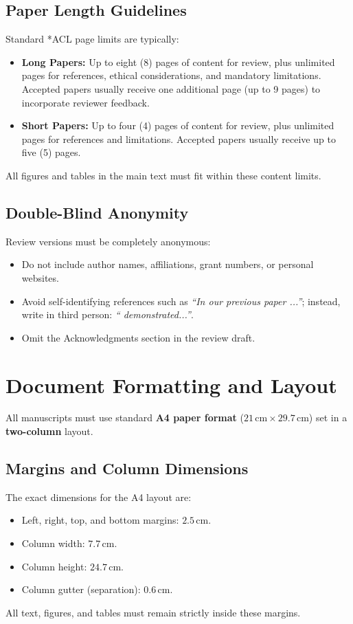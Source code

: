 \documentclass[11pt]{article}
\begin{document}
\subsection{Paper Length Guidelines}
Standard *ACL page limits are typically:
\begin{itemize}
    \item \textbf{Long Papers:} Up to eight (8) pages of content for review, plus unlimited pages for references, ethical considerations, and mandatory limitations. Accepted papers usually receive one additional page (up to 9 pages) to incorporate reviewer feedback.
    \item \textbf{Short Papers:} Up to four (4) pages of content for review, plus unlimited pages for references and limitations. Accepted papers usually receive up to five (5) pages.
\end{itemize}
All figures and tables in the main text must fit within these content limits.

\subsection{Double-Blind Anonymity}
Review versions must be completely anonymous:
\begin{itemize}
    \item Do not include author names, affiliations, grant numbers, or personal websites.
    \item Avoid self-identifying references such as \emph{``In our previous paper \citep{Gusfield:97}...''}; instead, write in third person: \emph{``\citet{Gusfield:97} demonstrated...''}.
    \item Omit the Acknowledgments section in the review draft.
\end{itemize}

\section{Document Formatting and Layout}
\label{sec:layout}

All manuscripts must use standard \textbf{A4 paper format} ($21\,\text{cm} \times 29.7\,\text{cm}$) set in a \textbf{two-column} layout.

\subsection{Margins and Column Dimensions}
The exact dimensions for the A4 layout are:
\begin{itemize}
    \item Left, right, top, and bottom margins: $2.5\,\text{cm}$.
    \item Column width: $7.7\,\text{cm}$.
    \item Column height: $24.7\,\text{cm}$.
    \item Column gutter (separation): $0.6\,\text{cm}$.
\end{itemize}
All text, figures, and tables must remain strictly inside these margins.
\end{document}
